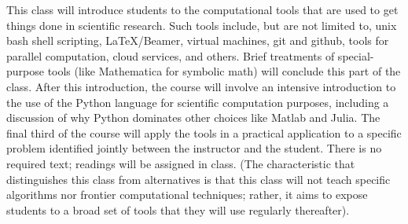 This class will introduce students to the computational tools that are used to get things done in scientific research. Such tools include, but are not limited to, unix bash shell scripting, LaTeX/Beamer, virtual machines, git and github, tools for parallel computation, cloud services, and others. Brief treatments of special-purpose tools (like Mathematica for symbolic math) will conclude this part of the class. After this introduction, the course will involve an intensive introduction to the use of the Python language for scientific computation purposes, including a discussion of why Python dominates other choices like Matlab and Julia. The final third of the course will apply the tools in a practical application to a specific problem identified jointly between the instructor and the student. There is no required text; readings will be assigned in class. (The characteristic that distinguishes this class from alternatives is that this class will not teach specific algorithms nor frontier computational techniques; rather, it aims to expose students to a broad set of tools that they will use regularly thereafter).
 
